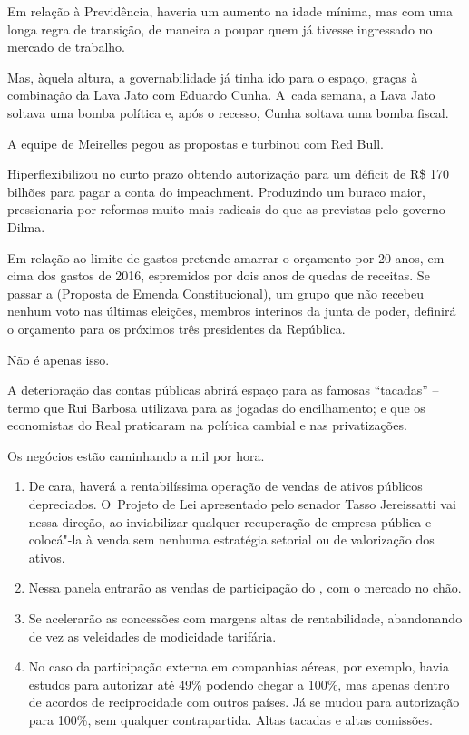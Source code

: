 Em relação à Previdência, haveria um aumento na idade mínima, mas com
uma longa regra de transição, de maneira a poupar quem já tivesse
ingressado no mercado de trabalho.

Mas, àquela altura, a governabilidade já tinha ido para o espaço, graças
à combinação da Lava Jato com Eduardo Cunha. A~cada semana, a Lava Jato
soltava uma bomba política e, após o recesso, Cunha soltava uma bomba
fiscal.

A equipe de Meirelles pegou as propostas e turbinou com Red Bull.

Hiperflexibilizou no curto prazo obtendo autorização para um déficit de
R\$ 170 bilhões para pagar a conta do impeachment. Produzindo um buraco
maior, pressionaria por reformas muito mais radicais do que as previstas
pelo governo Dilma.

Em relação ao limite de gastos pretende amarrar o orçamento por 20 anos,
em cima dos gastos de 2016, espremidos por dois anos de quedas de
receitas. Se passar a  (Proposta de Emenda Constitucional), um grupo
que não recebeu nenhum voto nas últimas eleições, membros interinos da
junta de poder, definirá o orçamento para os próximos três presidentes
da República.

Não é apenas isso.

A deterioração das contas públicas abrirá espaço para as famosas
``tacadas'' -- termo que Rui Barbosa utilizava para as jogadas do
encilhamento; e que os economistas do Real praticaram na política
cambial e nas privatizações.

Os negócios estão caminhando a mil por hora.

\begin{enumerate}
\itemsep1pt\parskip0pt
\item
  De cara, haverá a rentabilíssima operação de vendas de ativos públicos
  depreciados. O~Projeto de Lei apresentado pelo senador Tasso
  Jereissatti vai nessa direção, ao inviabilizar qualquer recuperação de
  empresa pública e colocá"-la à venda sem nenhuma estratégia setorial ou
  de valorização dos ativos.
\item
  Nessa panela entrarão as vendas de participação do , com o
  mercado no chão.
\item
  Se acelerarão as concessões com margens altas de rentabilidade,
  abandonando de vez as veleidades de modicidade tarifária.
\item
  No caso da participação externa em companhias aéreas, por exemplo,
  havia estudos para autorizar até 49\% podendo chegar a 100\%, mas
  apenas dentro de acordos de reciprocidade com outros países. Já se
  mudou para autorização para 100\%, sem qualquer contrapartida. Altas
  tacadas e altas comissões.
\end{enumerate}

